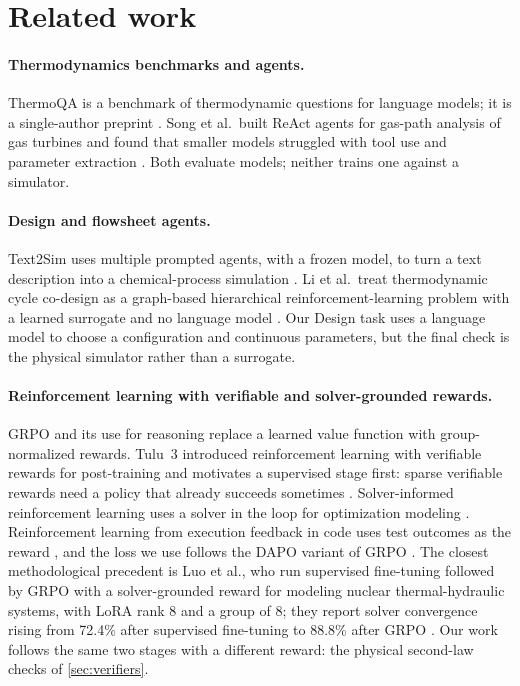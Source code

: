 \section{Related work}\label{sec:related}

\paragraph{Thermodynamics benchmarks and agents.}
ThermoQA is a benchmark of thermodynamic questions for language models; it is a single-author
preprint \citep{duzkar2026thermoqa}. Song et al.\ built ReAct agents for gas-path analysis of
gas turbines and found that smaller models struggled with tool use and parameter extraction
\citep{song2024gaspath}. Both evaluate models; neither trains one against a simulator.

\paragraph{Design and flowsheet agents.}
Text2Sim uses multiple prompted agents, with a frozen model, to turn a text description into a
chemical-process simulation \citep{tian2026text2sim}. Li et al.\ treat thermodynamic cycle co-design
as a graph-based hierarchical reinforcement-learning problem with a learned surrogate and no language
model \citep{li2026thermocycle}. Our Design task uses a language model to choose a configuration and
continuous parameters, but the final check is the physical simulator rather than a surrogate.

\paragraph{Reinforcement learning with verifiable and solver-grounded rewards.}
GRPO \citep{shao2024deepseekmath} and its use for reasoning \citep{guo2025deepseekr1} replace a learned
value function with group-normalized rewards. Tulu~3 introduced reinforcement learning with verifiable
rewards for post-training and motivates a supervised stage first: sparse verifiable rewards need a policy
that already succeeds sometimes \citep{lambert2024tulu3}. Solver-informed reinforcement learning uses
a solver in the loop for optimization modeling \citep{chen2025sirl}. Reinforcement learning from execution feedback
in code uses test outcomes as the reward \citep{gehring2024rlef}, and the loss we use follows the DAPO
variant of GRPO \citep{yu2025dapo}. The closest methodological precedent is Luo et al., who run
supervised fine-tuning followed by GRPO with a solver-grounded reward for modeling nuclear
thermal-hydraulic systems, with LoRA rank 8 and a group of 8; they report solver convergence rising
from 72.4\% after supervised fine-tuning to 88.8\% after GRPO \citep{luo2026nuclear}. Our work follows the same
two stages with a different reward: the physical second-law checks of \cref{sec:verifiers}.


